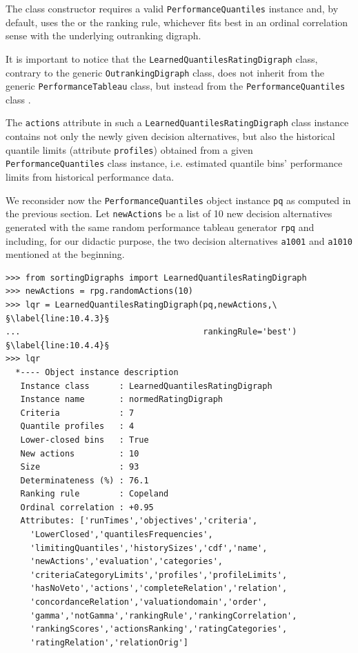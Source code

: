 The class constructor requires a valid \texttt{PerformanceQuantiles} instance and, by default, uses the \Copeland or the \NetFlows ranking rule, whichever fits best in an ordinal correlation sense with the underlying outranking digraph.

It is important to notice that the \texttt{LearnedQuantilesRatingDigraph} class, contrary to the generic \texttt{OutrankingDigraph} class, does not inherit from the generic \texttt{PerformanceTableau} class, but instead from the \texttt{Performance\-Quantiles} class \citep{BIS-2021b}.

The \texttt{actions} attribute in such a \texttt{LearnedQuantilesRatingDigraph} class instance contains not only the newly given decision alternatives, but also the historical quantile limits (attribute \texttt{profiles}) obtained from a given \texttt{Perfor\-manceQuantiles} class instance, i.e. estimated quantile bins' performance limits from historical performance data.

We reconsider now the \texttt{PerformanceQuantiles} object instance \texttt{pq} as computed in the previous section. Let \texttt{newActions} be a list of 10 new decision alternatives generated with the same random performance tableau generator \texttt{rpq} and including, for our didactic purpose, the two decision alternatives \texttt{a1001} and \texttt{a1010} mentioned at the beginning.
\begin{lstlisting}[caption={Computing the absolute rating of 10 new decision alternatives},label=list:10.4]
>>> from sortingDigraphs import LearnedQuantilesRatingDigraph
>>> newActions = rpg.randomActions(10)
>>> lqr = LearnedQuantilesRatingDigraph(pq,newActions,\ §\label{line:10.4.3}§
...                                     rankingRule='best') §\label{line:10.4.4}§
>>> lqr
  *---- Object instance description
   Instance class      : LearnedQuantilesRatingDigraph
   Instance name       : normedRatingDigraph
   Criteria            : 7
   Quantile profiles   : 4
   Lower-closed bins   : True
   New actions         : 10
   Size                : 93
   Determinateness (%) : 76.1
   Ranking rule        : Copeland
   Ordinal correlation : +0.95
   Attributes: ['runTimes','objectives','criteria',
     'LowerClosed','quantilesFrequencies',
     'limitingQuantiles','historySizes','cdf','name',
     'newActions','evaluation','categories',
     'criteriaCategoryLimits','profiles','profileLimits',
     'hasNoVeto','actions','completeRelation','relation',
     'concordanceRelation','valuationdomain','order',
     'gamma','notGamma','rankingRule','rankingCorrelation',
     'rankingScores','actionsRanking','ratingCategories',
     'ratingRelation','relationOrig']
\end{lstlisting}

